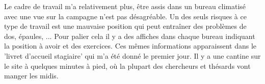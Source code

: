 Le cadre de travail m'a relativement plus, être assis dans un bureau climatisé avec une vue sur la campagne n'est pas désagréable. Un des seuls risques à ce type de travail est une mauvaise position qui peut entraîner des problèmes de dos, épaules, ... Pour palier cela il y a des affiches dans chaque bureau indiquant la position à avoir et des exercices. Ces mêmes informations apparaissent dans le 'livret d'accueil stagiaire' qui m'a été donné le premier jour.
Il y a une cantine sur le site à quelques minutes à pied, où la plupart des chercheurs et thésards vont manger les midis.



\begin{comment}
• L’entreprise s’est-elle engagée dans une démarche RSE ?
• Si c’est le cas, comment en évaluez-vous l’impact dans les domaines suivants ?
– Emploi et relations employeur-employé
– Conditions de travail et protection sociale
– Dialogue social
– Santé et sécurité au travail
– Développement des ressources humaines
• Quels objectifs le volet environnemental de sa démarche RSE favorise-t-il ?
– La réduction des impacts environnementaux
– L’économie des ressources
– Le traitement des déchets
– La gestion des déplacements
– Autre…
• Quel était l’impact de la démarche RSE et de ses objectifs sur votre travail en tant que stagiaire ?
• La parité homme-femme (rémunérations, carrières, embauches, formation) est-elle une réalité dans l’entreprise ? Sinon, des mesures ont-elles été prises pour l’atteindre ? Lesquelles ?
• L’entreprise a-t-elle pris des engagements éthiques ? Communique-t-elle une charte de bonne conduite ?
• Quels sont les risques sociaux et environnementaux que pourraient engendrer les activités de l’entreprise où vous avez effectué votre stage ? Quelles mesures celle-ci a-t-elle adoptées pour éviter ou amoindrir ces risques ?
• Qui sont les acteurs principaux dans les domaines de la prévention des risques et de la protection de la santé au travail (fonctions, missions, etc.) ?
• Existe-t-il une CSSCT ? Quelle est sa composition ? Quel est son rôle ?
• Existe-t-il un DUERP ? Sous quelle forme se présente-t-il ? Est-il régulièrement mis à jour et par qui ? Existe-t-il un suivi de la réalisation du programme d’actions ?
• Dans l’accomplissement des tâches qui vous ont été confiées, avez-vous observé des situations potentiellement dangereuses ?
Annexe IV. Développement durable, RSE, CSE
Charte des écrits et des oraux de l’IPSA – 2023-2024 – 41 / 46
• Avez-vous reçu une formation particulière relative à votre poste de travail ? Qui vous a dispensé cette formation (poste, fonction, etc.) ?
• Y a-t-il, dans l’entreprise, des équipements de protection collective ? Lesquels ?
• Y a-t-il des équipements de protection individuelle (lunettes, blouse, casque…) ? Les avez-vous
portés ? À quelles occasions ? Lesquels ?
• Vous a-t-on relaté des incidents liés à votre poste de travail ou à d’autres postes dans l’entreprise ?
• Si c’est le cas, des mesures ont-elles été prises à la suite de ces incidents ? Lesquelles ?
\end{comment}